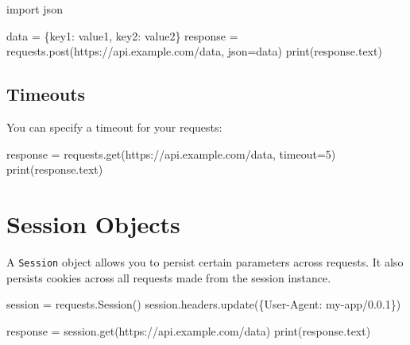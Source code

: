 \documentclass[
  letterpaper,
  DIV=11,
  numbers=noendperiod]{scrreprt}
\newenvironment{Shaded}{\begin{snugshade}}{\end{snugshade}}
\newcommand{\BuiltInTok}[1]{\textcolor[rgb]{0.00,0.23,0.31}{#1}}
\newcommand{\DecValTok}[1]{\textcolor[rgb]{0.68,0.00,0.00}{#1}}
\newcommand{\ImportTok}[1]{\textcolor[rgb]{0.00,0.46,0.62}{#1}}
\newcommand{\NormalTok}[1]{\textcolor[rgb]{0.00,0.23,0.31}{#1}}
\newcommand{\OperatorTok}[1]{\textcolor[rgb]{0.37,0.37,0.37}{#1}}
\newcommand{\StringTok}[1]{\textcolor[rgb]{0.13,0.47,0.30}{#1}}
\begin{document}
\begin{Shaded}
\begin{Highlighting}[]
\ImportTok{import}\NormalTok{ json}

\NormalTok{data }\OperatorTok{=}\NormalTok{ \{}\StringTok{\textquotesingle{}key1\textquotesingle{}}\NormalTok{: }\StringTok{\textquotesingle{}value1\textquotesingle{}}\NormalTok{, }\StringTok{\textquotesingle{}key2\textquotesingle{}}\NormalTok{: }\StringTok{\textquotesingle{}value2\textquotesingle{}}\NormalTok{\}}
\NormalTok{response }\OperatorTok{=}\NormalTok{ requests.post(}\StringTok{\textquotesingle{}https://api.example.com/data\textquotesingle{}}\NormalTok{, json}\OperatorTok{=}\NormalTok{data)}
\BuiltInTok{print}\NormalTok{(response.text)}
\end{Highlighting}
\end{Shaded}

\subsection{Timeouts}\label{timeouts}

You can specify a timeout for your requests:

\begin{Shaded}
\begin{Highlighting}[]
\NormalTok{response }\OperatorTok{=}\NormalTok{ requests.get(}\StringTok{\textquotesingle{}https://api.example.com/data\textquotesingle{}}\NormalTok{, timeout}\OperatorTok{=}\DecValTok{5}\NormalTok{)}
\BuiltInTok{print}\NormalTok{(response.text)}
\end{Highlighting}
\end{Shaded}

\section{Session Objects}\label{session-objects}

A \texttt{Session} object allows you to persist certain parameters
across requests. It also persists cookies across all requests made from
the session instance.

\begin{Shaded}
\begin{Highlighting}[]
\NormalTok{session }\OperatorTok{=}\NormalTok{ requests.Session()}
\NormalTok{session.headers.update(\{}\StringTok{\textquotesingle{}User{-}Agent\textquotesingle{}}\NormalTok{: }\StringTok{\textquotesingle{}my{-}app/0.0.1\textquotesingle{}}\NormalTok{\})}

\NormalTok{response }\OperatorTok{=}\NormalTok{ session.get(}\StringTok{\textquotesingle{}https://api.example.com/data\textquotesingle{}}\NormalTok{)}
\BuiltInTok{print}\NormalTok{(response.text)}
\end{Highlighting}
\end{Shaded}
\end{document}

